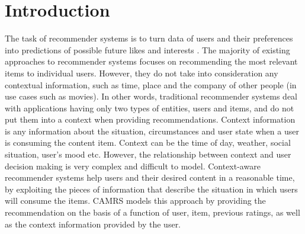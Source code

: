 \documentclass{article}
\begin{document}
 


\section{Introduction}
The task of recommender systems is to turn data of users and their preferences into predictions of possible future likes and interests \cite{adomavicius2011context}.  The majority of existing approaches to recommender systems focuses on recommending the most relevant items to individual users. However, they do not take into consideration any contextual information, such as time, place and the company of other people (in use cases such as movies). In other words, traditional recommender systems deal with applications having only two types of entities, users and items, and do not put them into a context when providing recommendations. 
Context information is any information about the situation, circumstances and user state when a user is consuming the content item. Context can be the time of day, weather, social situation, user’s mood etc.\cite{segaran2008programming} However, the relationship between context and user decision making is very complex and difficult to model. 
Context-aware recommender systems help users and their desired content in a reasonable time, by exploiting the pieces of information that describe the situation in which users will consume the items. CAMRS models this approach by providing the recommendation on the basis of a function of user, item, previous ratings, as well as the context information provided by the user.
\end{document}

